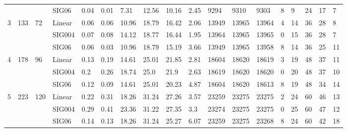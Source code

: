 \begin{longtable}{llllllllllllllllll}
 &  &  & SIG06 & \num{0.04} & \num{0.01} & \num{7.31} & \num{12.56} & \num{10.16} & \num{2.45} & \num{9294} & \num{9310} & \num{9303} & \num{8} & \num{9} & \num{24} & \num{17} & \num{7} \\
\cline{1-18} \cline{2-18} \cline{3-18}
\multirow[t]{3}{*}{3} & \multirow[t]{3}{*}{133} & \multirow[t]{3}{*}{72} & Linear & \num{0.06} & \num{0.06} & \num{10.96} & \num{18.79} & \num{16.42} & \num{2.06} & \num{13949} & \num{13965} & \num{13964} & \num{4} & \num{14} & \num{36} & \num{28} & \num{8} \\
 &  &  & SIG004 & \num{0.07} & \num{0.08} & \num{14.12} & \num{18.77} & \num{16.44} & \num{1.95} & \num{13964} & \num{13965} & \num{13965} & \num{0} & \num{15} & \num{36} & \num{28} & \num{7} \\
 &  &  & SIG06 & \num{0.06} & \num{0.03} & \num{10.96} & \num{18.79} & \num{15.19} & \num{3.66} & \num{13949} & \num{13965} & \num{13958} & \num{8} & \num{14} & \num{36} & \num{25} & \num{11} \\
\cline{1-18} \cline{2-18} \cline{3-18}
\multirow[t]{3}{*}{4} & \multirow[t]{3}{*}{178} & \multirow[t]{3}{*}{96} & Linear & \num{0.13} & \num{0.19} & \num{14.61} & \num{25.01} & \num{21.85} & \num{2.81} & \num{18604} & \num{18620} & \num{18619} & \num{3} & \num{19} & \num{48} & \num{37} & \num{11} \\
 &  &  & SIG004 & \num{0.2} & \num{0.26} & \num{18.74} & \num{25.0} & \num{21.9} & \num{2.63} & \num{18619} & \num{18620} & \num{18620} & \num{0} & \num{20} & \num{48} & \num{37} & \num{10} \\
 &  &  & SIG06 & \num{0.12} & \num{0.09} & \num{14.61} & \num{25.01} & \num{20.23} & \num{4.87} & \num{18604} & \num{18620} & \num{18613} & \num{8} & \num{19} & \num{48} & \num{34} & \num{14} \\
\cline{1-18} \cline{2-18} \cline{3-18}
\multirow[t]{3}{*}{5} & \multirow[t]{3}{*}{223} & \multirow[t]{3}{*}{120} & Linear & \num{0.22} & \num{0.31} & \num{18.26} & \num{31.24} & \num{27.26} & \num{3.57} & \num{23259} & \num{23275} & \num{23275} & \num{2} & \num{24} & \num{60} & \num{46} & \num{13} \\
 &  &  & SIG004 & \num{0.29} & \num{0.41} & \num{23.36} & \num{31.22} & \num{27.35} & \num{3.3} & \num{23274} & \num{23275} & \num{23275} & \num{0} & \num{25} & \num{60} & \num{47} & \num{12} \\
 &  &  & SIG06 & \num{0.14} & \num{0.13} & \num{18.26} & \num{31.24} & \num{25.27} & \num{6.07} & \num{23259} & \num{23275} & \num{23268} & \num{8} & \num{24} & \num{60} & \num{42} & \num{18} \\

\end{longtable}

